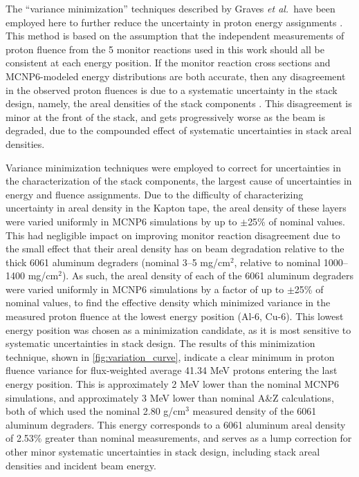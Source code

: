 \documentclass[3p]{elsarticle}
\newcommand{\etal}{\emph{et al.}}
\begin{document}
The \enquote{variance minimization} techniques  described by  Graves \etal\  have been employed here to further reduce the uncertainty in proton energy assignments     \cite{Graves2016}.
This method is based on the assumption that the independent measurements of proton fluence from the 5 monitor reactions used in this work should all be consistent at each energy position.
If the monitor reaction cross sections and MCNP6-modeled energy distributions are both accurate, then any disagreement in the  observed proton fluences is due to a systematic uncertainty in the stack design, namely, the areal densities of the stack components \cite{Graves2016,Marus2015}. 
This disagreement is minor at the front of the stack, and gets progressively worse as the beam is degraded, due to the compounded effect of systematic uncertainties in stack areal densities.



Variance minimization techniques were employed  to correct for uncertainties in  the characterization of the stack components, the largest cause of uncertainties in energy and  fluence assignments.
Due to the difficulty of characterizing uncertainty in areal density in the Kapton tape, the areal density of these layers were varied uniformly in MCNP6 simulations by up to $\pm$25\% of nominal values.
This had negligible impact on improving monitor reaction disagreement  due to the small effect that their areal density has on beam degradation relative to the thick 6061 aluminum degraders (nominal 3--5 mg/cm$^2$, relative to nominal 1000--1400 mg/cm$^2$).
As such,  the areal density of each of the 6061 aluminum degraders  were varied uniformly in MCNP6 simulations  by a factor of up to $\pm$25\% of nominal values, to find the effective density which minimized variance in the measured proton fluence at the lowest energy position (Al-6, Cu-6).
This lowest energy position was chosen as a minimization candidate, as it is most sensitive to systematic uncertainties in stack design.
The results of this minimization technique, shown in \autoref{fig:variation_curve}, indicate a clear minimum in proton fluence variance for flux-weighted average 41.34 MeV protons entering the last energy position.
This is approximately 2 MeV lower than the nominal MCNP6 simulations, and approximately 3 MeV lower than nominal A\&Z calculations, both of which used the nominal 2.80 g/cm$^3$ measured density of the 6061 aluminum degraders.
This energy corresponds to a 6061 aluminum areal density of 2.53\% greater than nominal measurements, and serves as a lump correction for other minor systematic uncertainties in stack design, including stack areal densities and incident beam energy.
\end{document}
